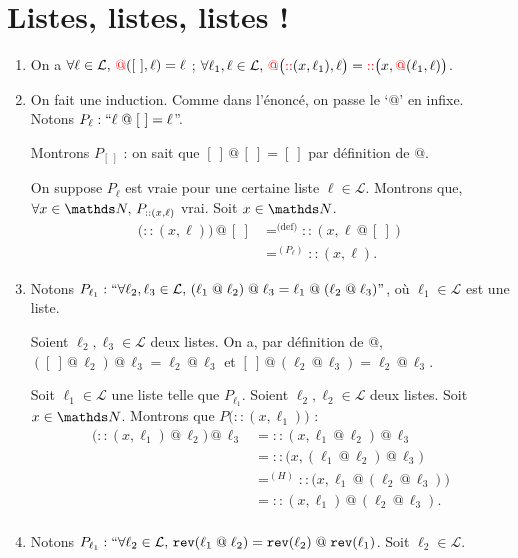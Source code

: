\section{Listes, listes, listes !}

\begin{enumerate}
	\item On a $\forall \ell \in \mathcal{L},\,{\color{red}\mathtt{@}}([~],\ell) = \ell$\/ ; $\forall  \ell_1, \ell \in \mathcal{L},\,{\color{red}\mathtt{@}}\big({\color{red}::}(x, \ell_1), \ell\big) = {\color{red}::}\big(x,{\color{red}\mathtt{@}}(\ell_1, \ell)\big)$.
	\item On fait une induction. Comme dans l'énoncé, on passe le `$@$\/' en infixe.
		Notons $P_\ell : ``\ell\mathrel{@} [~] = \ell$\/''.

		Montrons $P_{[~]}$\/ : on sait que $[~]\mathrel{@} [~] = [~]$\/ par définition de $@$.

		On suppose $P_\ell$\/ est vraie pour une certaine liste $\ell \in \mathcal{L}$. Montrons que, $\forall x \in \N,\,P_{{::}(x,\ell)}$\/ vrai. Soit $x \in \N$.
		\begin{align*}
			\big({::}(x,\ell)\big)\mathrel{@}[~] &\mathrel{\mathop{=}^{\text{(def)}}} {::}(x, \ell \mathrel{@}[~])\\
			&\mathrel{\mathop{=}^{(P_\ell)}} {::}(x, \ell).
		\end{align*}
	\item Notons $P_{\ell_1} : ``\forall \ell_2,\ell_3 \in \mathcal{L},\,(\ell_1\mathrel@\ell_2)\mathrel@\ell_3 = \ell_1 \mathrel@ (\ell_2 \mathrel@ \ell_3)"$, où $\ell_1 \in \mathcal{L}$\/ est une liste.

		Soient $\ell_2, \ell_3 \in \mathcal{L}$\/ deux listes. On a, par définition de $@$, $([~]\mathrel@ \ell_2) \mathrel@ \ell_3 = \ell_2 \mathrel@ \ell_3$\/ et $[~]\mathrel@(\ell_2\mathrel@\ell_3) = \ell_2 \mathrel@ \ell_3$.

		Soit $\ell_1 \in \mathcal{L}$\/ une liste telle que $P_{\ell_1}$. Soient $\ell_2, \ell_2 \in \mathcal{L}$\/ deux listes. Soit $x \in \N$. Montrons que $P\big({::}(x,\ell_1)\big)$ :
		\begin{align*}
			\big({::}(x, \ell_1)\mathrel @ \ell_2\big)\mathrel@ \ell_3 &= {::}(x, \ell_1 \mathrel@ \ell_2) \mathrel@ \ell_3 \\
			&= {::}\big(x, (\ell_1 \mathrel@ \ell_2) \mathrel@ \ell_3\big)  \\
			&\mathrel{\mathop=^{(H)}} {::}\big(x, \ell_1 \mathrel@(\ell_2 \mathrel@ \ell_3)\big)  \\
			&= {::}(x, \ell_1)\mathrel@(\ell_2 \mathrel@ \ell_3). \\
		\end{align*}
	\item Notons  $P_{\ell_1} : ``\forall \ell_2 \in \mathcal{L},\,{\tt rev}\/(\ell_1\mathrel@\ell_2) = {\tt rev}\/(\ell_2) \mathrel@ {\tt rev}\/(\ell_1)$. Soit $\ell_2 \in \mathcal{L}$.


\end{enumerate}
